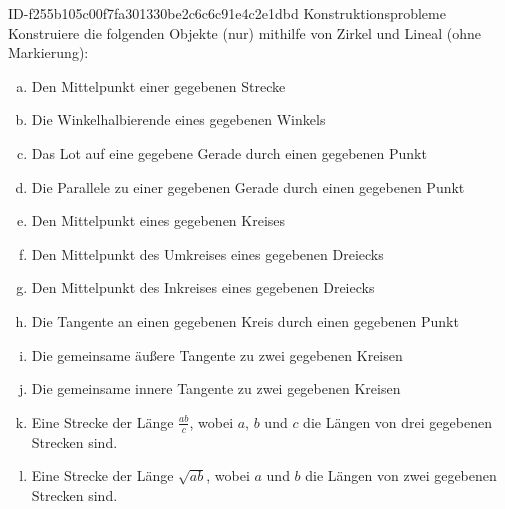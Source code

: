 \begin{exercise}
      {ID-f255b105c00f7fa301330be2c6c6c91e4c2e1dbd}
      {Konstruktionsprobleme}
  \ifproblem\problem
    Konstruiere die folgenden Objekte (nur) mithilfe von Zirkel und Lineal (ohne Markierung):
    \begin{enumerate}[a)]
      \item Den Mittelpunkt einer gegebenen Strecke
      \item Die Winkelhalbierende eines gegebenen Winkels
      \item Das Lot auf eine gegebene Gerade durch einen gegebenen Punkt
      \item Die Parallele zu einer gegebenen Gerade durch einen gegebenen Punkt
      \item Den Mittelpunkt eines gegebenen Kreises
      \item Den Mittelpunkt des Umkreises eines gegebenen Dreiecks
      \item Den Mittelpunkt des Inkreises eines gegebenen Dreiecks
      \item Die Tangente an einen gegebenen Kreis durch einen gegebenen Punkt
      \item Die gemeinsame äußere Tangente zu zwei gegebenen Kreisen
      \item Die gemeinsame innere Tangente zu zwei gegebenen Kreisen
      \item Eine Strecke der Länge $\frac{ab}{c}$, wobei $a$, $b$ und $c$
            die Längen von drei gegebenen Strecken sind.
      \item Eine Strecke der Länge $\sqrt{ab}$, wobei $a$ und $b$
            die Längen von zwei gegebenen Strecken sind.
    \end{enumerate}
  \fi
\end{exercise}
